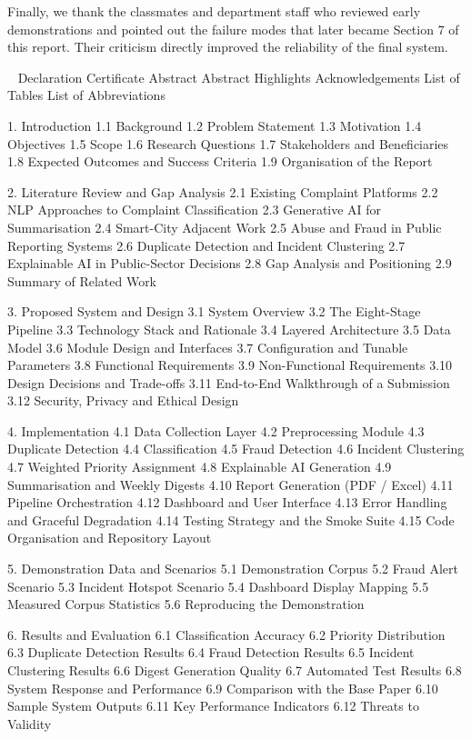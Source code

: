 \documentclass[10pt,letterpaper,oneside]{article}\usepackage{geometry}\geometry{top=1in,bottom=1in,left=1in,right=1in,includeheadfoot}\usepackage{xcolor}\definecolor{color@navy}{HTML}{1F3B63}\definecolor{color@grey}{HTML}{404040}\definecolor{color@hdr}{HTML}{F2F4F7}\usepackage{titlesec}\titleformat{\section}  {\normalfont\huge\bfseries\color@navy}  {}{0pt}{\MakeUppercase}\titleformat{\subsection}  {\normalfont\Large\bfseries\color@navy}  {}{0pt}{}\titleformat{\subsubsection}  {\normalfont\large\bfseries\color@navy}  {}{0pt}{}\titlespacing*{\section}{0pt}{14pt}{6pt}\titlespacing*{\subsection}{0pt}{10pt}{4pt}\titlespacing*{\subsubsection}{0pt}{8pt}{3pt}\setlength{\parindent}{0pt}\setlength{\parskip}{0.6em}\parindent=0pt\usepackage{enumitem}\setlist{nosep,leftmargin=*,itemsep=0pt,topsep=2pt,partopsep=0pt}\usepackage{array}\usepackage{booktabs}\usepackage{caption}\captionsetup{font={small,it},labelfont={bf},labelsep=period,  parskip=2pt,skip=4pt,list=no}\captionsetup[table]{labelfont={bf,small,color@navy},name=Table}\usepackage{graphicx}\usepackage{verbatim}\usepackage{ragged2e}\usepackage{longtable}\usepackage{tabularx}\usepackage{multirow}\usepackage{colortbl}\definecolor{rowshade}{HTML}{F2F4F7}\usepackage{tikz}\usetikzlibrary{positioning,calc}\usepackage[hidelinks]{hyperref}\hypersetup{colorlinks=true,linkcolor=color@navy,urlcolor=color@navy}\pagestyle{fancy}\fancyhf{}\renewcommand{\headrulewidth}{0.4pt}\fancyhead[L]{\small\color@navy CivicSense — Project Report}\fancyhead[R]{\small\color@grey October 11, 2026}\fancyfoot[C]{\small\color@grey An Integrated Intelligent Triage Pipelin}\fancyfoot[R]{\small\color@grey Page \thepage}\usepackage{setspace}\setstretch{1.15}\AtBeginDocument{  \hypersetup{pdftitle={An Integrated Intelligent Triage Pipeline for AI-Enhanced Citizen Complaint Management},    pdfauthor={CivicSense Project Team},    pdfsubject={Project Report},    pdfkeywords={smart cities, NLP, complaint management, e-governance},    pdfcreator={CivicSense Project Team}  }}
\begin{document}
Finally, we thank the classmates and department staff who reviewed early demonstrations and pointed out the failure modes that later became Section 7 of this report. Their criticism directly improved the reliability of the final system.

\clearpage
{}

 
Declaration
Certificate
Abstract
   Abstract Highlights
Acknowledgements
List of Tables
List of Abbreviations

1. Introduction
   1.1 Background
   1.2 Problem Statement
   1.3 Motivation
   1.4 Objectives
   1.5 Scope
   1.6 Research Questions
   1.7 Stakeholders and Beneficiaries
   1.8 Expected Outcomes and Success Criteria
   1.9 Organisation of the Report

2. Literature Review and Gap Analysis
   2.1 Existing Complaint Platforms
   2.2 NLP Approaches to Complaint Classification
   2.3 Generative AI for Summarisation
   2.4 Smart-City Adjacent Work
   2.5 Abuse and Fraud in Public Reporting Systems
   2.6 Duplicate Detection and Incident Clustering
   2.7 Explainable AI in Public-Sector Decisions
   2.8 Gap Analysis and Positioning
   2.9 Summary of Related Work

3. Proposed System and Design
   3.1 System Overview
   3.2 The Eight-Stage Pipeline
   3.3 Technology Stack and Rationale
   3.4 Layered Architecture
   3.5 Data Model
   3.6 Module Design and Interfaces
   3.7 Configuration and Tunable Parameters
   3.8 Functional Requirements
   3.9 Non-Functional Requirements
   3.10 Design Decisions and Trade-offs
   3.11 End-to-End Walkthrough of a Submission
   3.12 Security, Privacy and Ethical Design

4. Implementation
   4.1 Data Collection Layer
   4.2 Preprocessing Module
   4.3 Duplicate Detection
   4.4 Classification
   4.5 Fraud Detection
   4.6 Incident Clustering
   4.7 Weighted Priority Assignment
   4.8 Explainable AI Generation
   4.9 Summarisation and Weekly Digests
   4.10 Report Generation (PDF / Excel)
   4.11 Pipeline Orchestration
   4.12 Dashboard and User Interface
   4.13 Error Handling and Graceful Degradation
   4.14 Testing Strategy and the Smoke Suite
   4.15 Code Organisation and Repository Layout

5. Demonstration Data and Scenarios
   5.1 Demonstration Corpus
   5.2 Fraud Alert Scenario
   5.3 Incident Hotspot Scenario
   5.4 Dashboard Display Mapping
   5.5 Measured Corpus Statistics
   5.6 Reproducing the Demonstration

6. Results and Evaluation
   6.1 Classification Accuracy
   6.2 Priority Distribution
   6.3 Duplicate Detection Results
   6.4 Fraud Detection Results
   6.5 Incident Clustering Results
   6.6 Digest Generation Quality
   6.7 Automated Test Results
   6.8 System Response and Performance
   6.9 Comparison with the Base Paper
   6.10 Sample System Outputs
   6.11 Key Performance Indicators
   6.12 Threats to Validity
\end{document}

